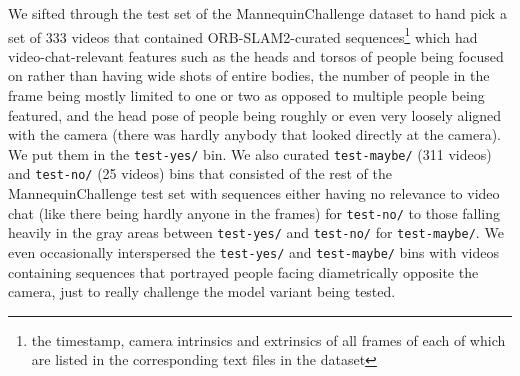 We sifted through the test set of the MannequinChallenge dataset to hand pick a set of 333 videos that contained ORB-SLAM2-curated sequences\footnote{the timestamp, camera intrinsics and extrinsics of all frames of each of which are listed in the corresponding text files in the dataset} which had video-chat-relevant features such as the heads and torsos of people being focused on rather than having wide shots of entire bodies, the number of people in the frame being mostly limited to one or two as opposed to multiple people being featured, and the head pose of people being roughly or even very loosely aligned with the camera (there was hardly anybody that looked directly at the camera). We put them in the \texttt{test-yes/} bin. We also curated \texttt{test-maybe/} (311 videos) and \texttt{test-no/} (25 videos) bins that consisted of the rest of the MannequinChallenge test set with sequences either having no relevance to video chat (like there being hardly anyone in the frames) for \texttt{test-no/} to those falling heavily in the gray areas between \texttt{test-yes/} and \texttt{test-no/} for \texttt{test-maybe/}. We even occasionally interspersed the \texttt{test-yes/} and \texttt{test-maybe/} bins with videos containing sequences that portrayed people facing diametrically opposite the camera, just to really challenge the model variant being tested.

